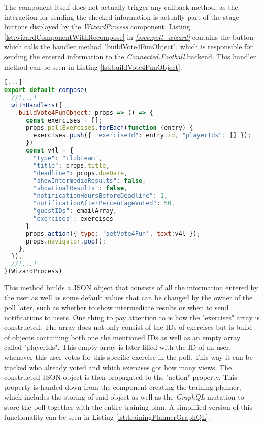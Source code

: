 The component itself does not actually trigger any callback method, as the interaction for sending the checked information is actually part of the stage buttons displayed by the \textit{WizardProcess} component. Listing \ref{lst:wizardComponentWithRecompose} in \textit{\ref{ssec:poll_wizard} } contains the button which calls the handler method "buildVote4FunObject", which is responsible for sending the entered information to the \textit{Connected.Football} backend. This handler method can be seen in Listing \ref{lst:buildVote4FunObject}.

\begin{lstlisting}[language=javascript,caption=\textit{buildVote4FunObject} Handler Method,label=lst:buildVote4FunObject]
[...]
export default compose(
  //[...]
  withHandlers({
    buildVote4FunObject: props => () => {
      const exercises = [];
      props.pollExercises.forEach(function (entry) {
        exercises.push({ "exerciseId": entry.id, "playerIds": [] });
      })
      const v4l = {
        "type": "clubteam",
        "title": props.title,
        "deadline": props.dueDate,
        "showIntermediaResults": false,
        "showFinalResults": false,
        "notificationHoursBeforeDeadline": 1,
        "notificationAfterPercentageVoted": 50,
        "guestIDs": emailArray,
        "exercises": exercises
      }
      props.action({ type: 'setVote4Fun', text:v4l });
      props.navigator.pop();
    },
  }),
  //[...]
)(WizardProcess)
\end{lstlisting}

This method builds a JSON object that consists of all the information entered by the user as well as some default values that can be changed by the owner of the poll later, such as whether to show intermediate results or when to send notifications to users. One thing to pay attention to is how the "exercises" array is constructed. The array does not only consist of the IDs of exercises but is build of objects containing both one the mentioned IDs as well as an empty array called "playerIds". This empty array is later filled with the ID of an user, whenever this user votes for this specific exercise in the poll. This way it can be tracked who already voted and which exercises got how many views.
\newline
The constructed JSON object is then propagated to the "action" property. This property is handed down from the component creating the training planner, which includes the storing of said object as well as the \textit{GraphQL} mutation to store the poll together with the entire training plan. A simplified version of this functionality can be seen in Listing \ref{lst:trainingPlannerGraphQL}.

